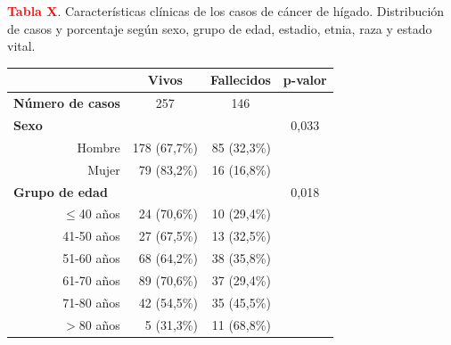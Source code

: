 \textbf{\textcolor{red}{Tabla X}}. Características clínicas de los casos de cáncer de hígado. Distribución de casos y porcentaje según sexo, grupo de edad, estadio, etnia, raza y estado vital.

\begin{table}[H]
	\centering
	\begin{tabular}{rrrc}
		\cline{2-4}
		\multicolumn{1}{l}{}                           & \multicolumn{1}{c}{\textbf{Vivos}} & \multicolumn{1}{c}{\textbf{Fallecidos}} & \multicolumn{1}{l}{\textbf{p-valor}} \\ \hline
		\multicolumn{1}{l}{\textbf{Número de casos}} & \multicolumn{1}{c}{257}            & \multicolumn{1}{c}{146}     & \multicolumn{1}{l}{}                     \\ \hline
		\multicolumn{1}{l}{\textbf{Sexo}}              &                           &                             & 0,033                                    \\
		Hombre                                         & 178 (67,7\%)              & 85 (32,3\%)                 &                                          \\
		Mujer                                          & 79 (83,2\%)               & 16 (16,8\%)                 &                                          \\ \hline
		\multicolumn{1}{l}{\textbf{Grupo de edad}}     &                           &                             & 0,018                                    \\
		$\leq$40 años                                      & 24 (70,6\%)               & 10 (29,4\%)                 &                                          \\
		41-50 años                                     & 27 (67,5\%)               & 13 (32,5\%)                 &                                          \\
		51-60 años                                     & 68 (64,2\%)               & 38 (35,8\%)                 &                                          \\
		61-70 años                                     & 89 (70,6\%)               & 37 (29,4\%)                 &                                          \\
		71-80 años                                     & 42 (54,5\%)               & 35 (45,5\%)                 &                                          \\
		$>$80 años                                   & 5 (31,3\%)                & 11 (68,8\%)                 &                                          \\ \hline

\end{tabular}
\end{table}
